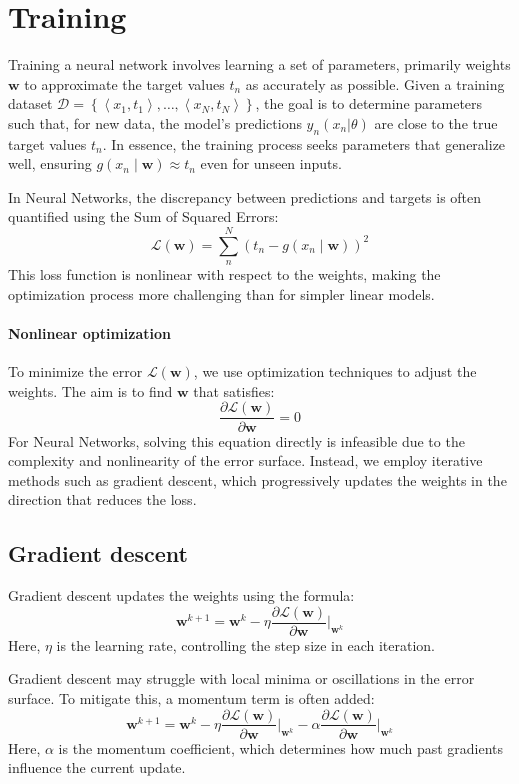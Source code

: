 \section{Training}

Training a neural network involves learning a set of parameters, primarily weights $\mathbf{w}$ to approximate the target values $t_n$ as accurately as possible.
Given a training dataset $\mathcal{D}=\left\{\left\langle x_1,t_1 \right\rangle,\dots,\left\langle x_N,t_N\right\rangle\right\}$, the goal is to determine parameters such that, for new data, the model's predictions $y_n(x_n|\theta)$ are close to the true target values $t_n$.
In essence, the training process seeks parameters that generalize well, ensuring $g(x_n\mid\mathbf{w})\approx t_n$ even for unseen inputs.

In Neural Networks, the discrepancy between predictions and targets is often quantified using the Sum of Squared Errors:
\[\mathcal{L}(\mathbf{w})=\sum_n^N\left(t_n-g(x_n\mid\mathbf{w})\right)^2\]
This loss function is nonlinear with respect to the weights, making the optimization process more challenging than for simpler linear models.

\paragraph*{Nonlinear optimization}
To minimize the error $\mathcal{L}(\mathbf{w})$, we use optimization techniques to adjust the weights. 
The aim is to find $\mathbf{w}$ that satisfies:
\[\dfrac{\partial \mathcal{L}(\mathbf{w})}{\partial \mathbf{w}}=0\]
For Neural Networks, solving this equation directly is infeasible due to the complexity and nonlinearity of the error surface. 
Instead, we employ iterative methods such as gradient descent, which progressively updates the weights in the direction that reduces the loss.

\subsection{Gradient descent}
Gradient descent updates the weights using the formula:
\[\mathbf{w}^{k+1}=\mathbf{w}^k-\eta\dfrac{\partial \mathcal{L}(\mathbf{w})}{\partial \mathbf{w}}\Bigg|_{\mathbf{w}^k}\]
Here, $\eta$ is the learning rate, controlling the step size in each iteration. 

Gradient descent may struggle with local minima or oscillations in the error surface. 
To mitigate this, a momentum term is often added:
\[\mathbf{w}^{k+1}=\mathbf{w}^k-\eta\dfrac{\partial \mathcal{L}(\mathbf{w})}{\partial \mathbf{w}}\Bigg|_{\mathbf{w}^k}-\alpha\dfrac{\partial \mathcal{L}(\mathbf{w})}{\partial \mathbf{w}}\Bigg|_{\mathbf{w}^k}\]
Here, $\alpha$ is the momentum coefficient, which determines how much past gradients influence the current update. 

